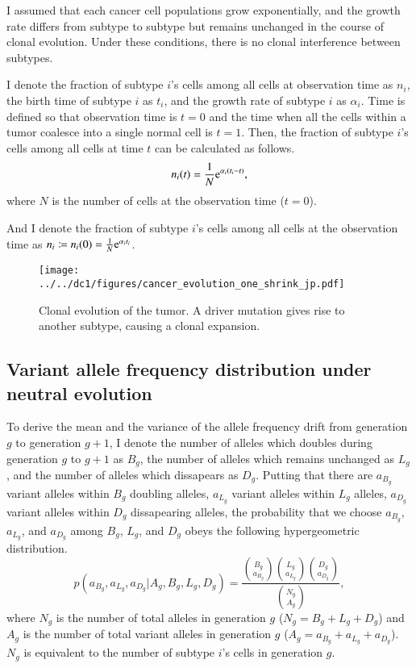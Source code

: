 \documentclass{article}
\begin{document}
I assumed that each cancer cell populations grow exponentially, and the growth rate differs from subtype to subtype but remains unchanged in the course of clonal evolution. Under these conditions, there is no clonal interference between subtypes.

I denote the fraction of subtype $i$'s cells among all cells at observation time as $n_i$, the birth time of subtype $i$ as $t_i$, and the growth rate of subtype $i$ as $\alpha_i$.
Time is defined so that observation time is $t=0$ and the time when all the cells within a tumor coalesce into a single normal cell is $t=1$.
Then, the fraction of subtype $i$'s cells among all cells at time $t$ can be calculated as follows.
\begin{equation}
 n_i(t) = \frac{1}{N}\mathrm{e}^{\alpha_i (t_i - t)},
\end{equation}
where $N$ is the number of cells at the observation time ($t=0$).

And I denote the fraction of subtype $i$'s cells among all cells at the observation time as $n_i \coloneqq n_i(0) = \frac{1}{N}\mathrm{e}^{\alpha_i t_i}$.

\begin{figure}[H]
\begin{center}
  \texttt{[image: ../../dc1/figures/cancer\_evolution\_one\_shrink\_jp.pdf]}
 \caption{Clonal evolution of the tumor. A driver mutation gives rise to another subtype, causing a clonal expansion.}
 \label{fig: clonal_expansion}
\end{center}
\end{figure}

\subsection{Variant allele frequency distribution under neutral evolution}
To derive the mean and the variance of the allele frequency drift from generation $g$ to generation $g+1$, I denote the number of alleles which doubles during generation $g$ to $g+1$ as $B_g$, the number of alleles which remains unchanged as $L_g$, and the number of alleles which dissapears as $D_g$. Putting that there are $a_{B_g}$ variant alleles within $B_g$ doubling alleles, $a_{L_g}$ variant alleles within $L_g$ alleles, $a_{D_g}$ variant alleles within $D_g$ dissapearing alleles, the probability that we choose $a_{B_g}$, $a_{L_g}$, and $a_{D_g}$ among $B_g$, $L_g$, and $D_g$ obeys the following hypergeometric distribution.
\begin{equation}
 p(a_{B_g}, a_{L_g}, a_{D_g} | A_g, B_g, L_g, D_g) = \frac{{B_g \choose a_{B_g}}{L_g \choose a_{L_g}}{D_g \choose a_{D_g}}}{{N_g \choose A_g}},
\end{equation}
where $N_g$ is the number of total alleles in generation $g$ ($N_g = B_g + L_g + D_g$) and $A_g$ is the number of total variant alleles in generation $g$ ($A_g = a_{B_g} + a_{L_g} + a_{D_g}$).
$N_g$ is equivalent to the number of subtype $i$'s cells in generation $g$.
\end{document}
